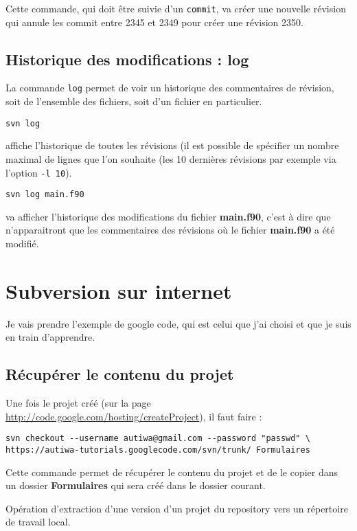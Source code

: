 \documentclass[a4paper,twoside]{article}
\begin{document}
Cette commande, qui doit être suivie d'un \texttt{commit}, va créer une nouvelle révision qui annule les commit entre 2345 et 2349 pour créer une révision 2350. 

\subsection{Historique des modifications : log}
La commande \texttt{log} permet de voir un historique des commentaires de révision, soit de l'ensemble des fichiers, soit d'un fichier en particulier.

\begin{verbatim}
svn log
\end{verbatim}
affiche l'historique de toutes les révisions (il est possible de spécifier un nombre maximal de lignes que l'on souhaite (les 10 dernières révisions par exemple via l'option \texttt{-l 10}). 

\begin{verbatim}
svn log main.f90
\end{verbatim}
va afficher l'historique des modifications du fichier \textbf{main.f90}, c'est à dire que n'apparaitront que les commentaires des révisions où le fichier \textbf{main.f90} a été modifié.


\section{Subversion sur internet}
Je vais prendre l'exemple de google code, qui est celui que j'ai choisi et que je suis en train d'apprendre.

\subsection{Récupérer le contenu du projet}\label{sec:checkout}
Une fois le projet créé (sur la page \url{http://code.google.com/hosting/createProject}), il faut faire : 
\begin{verbatim}
svn checkout --username autiwa@gmail.com --password "passwd" \
https://autiwa-tutorials.googlecode.com/svn/trunk/ Formulaires
\end{verbatim}

Cette commande permet de récupérer le contenu du projet et de le copier dans un dossier \textbf{Formulaires} qui sera créé dans le dossier courant.

\begin{definition}[Checkout]
Opération d'extraction d'une version d'un projet du repository vers un répertoire de travail local.
\end{definition}
\end{document}
